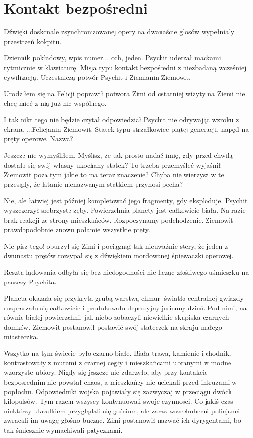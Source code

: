 \chapter{Kontakt bezpośredni}

Dźwięki doskonale zsynchronizowanej opery na dwanaście głosów wypełniały przestrzeń kokpitu.

\ds{} Dziennik pokładowy, wpis numer... och, jeden. \dm{} Psychit uderzał mackami rytmicznie w klawiaturę. \dm{}
Misja typu kontakt bezpośredni z niezbadaną wcześniej cywilizacją. Uczestniczą potwór Psychit i Ziemianin Ziemowit. \de{}

\ds{} Urodziłem się na Felicji \dm{} poprawił potwora Zimi \dm{} od ostatniej wizyty na Ziemi nie chcę mieć z nią już nic wspólnego. \de{}

\ds{} I tak nikt tego nie będzie czytał \dm{} odpowiedział Psychit nie odrywając wzroku z ekranu \dm{} ...Felicjanin Ziemowit.
Statek typu strzałkowiec piątej generacji, napęd na pręty operowe. Nazwa? \de{}

\ds{} Jeszcze nie wymyśliłem. Myślisz, że tak prosto nadać imię, gdy przed chwilą dostało się swój własny ukochany statek? To trzeba przemyśleć \dm{}
wyjaśnił Ziemowit \dm{} poza tym jakie to ma teraz znaczenie? Chyba nie wierzysz w te przesądy, że latanie nienazwanym statkiem przynosi pecha? \de{}

\ds{} Nie, ale łatwiej jest później kompletować jego fragmenty, gdy eksploduje. \dm{} Psychit wyszczerzył srebrzyste zęby. \dm{}
Powierzchnia planety jest całkowicie biała. Na razie brak reakcji ze strony mieszkańców. Rozpoczynamy podchodzenie.
Ziemowit prawdopodobnie znowu połamie wszystkie pręty. \de{}

\ds{} Nie pisz tego! \dm{} oburzył się Zimi i pociągnął tak nieuważnie stery, że jeden z dwunastu prętów rozsypał się z dźwiękiem mordowanej śpiewaczki operowej. \de{}

Reszta lądowania odbyła się bez niedogodności nie licząc złośliwego uśmieszku na paszczy Psychita.

\divider{}
Planeta okazała się przykryta grubą warstwą chmur, światło centralnej gwiazdy rozpraszało się całkowicie i produkowało depresyjny jesienny dzień.
Pod nimi, na równie białej powierzchni, jak niebo zobaczyli niewielkie skupiska czarnych domków. 
Ziemowit postanowił postawić swój stateczek na skraju małego miasteczka.

Wszytko na tym świecie było czarno-białe. Biała trawa, kamienie i chodniki kontrastowały z murami z czarnej cegły i mieszkańcami ubranymi w modne wzorzyste ubiory.
Nigdy się jeszcze nie zdarzyło, aby przy kontakcie bezpośrednim nie powstał chaos, a mieszkańcy nie uciekali przed intruzami w popłochu. 
Odpowiedniki wojska pojawiały się zazwyczaj w przeciągu dwóch kilopulsów.
Tym razem wszyscy kontynuowali swoje czynności.
Co jakiś czas niektórzy ukradkiem przyglądali się gościom, ale zaraz wszechobecni policjanci zwracali im uwagę głośno bucząc.
Zimi postanowił nazwać ich dyrygentami, bo tak śmiesznie wymachiwali patyczkami.

